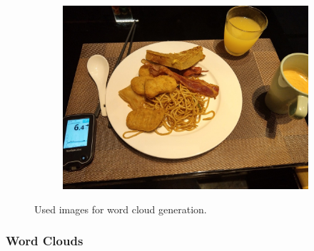 \begin{figure}[H]
\begin{subfigure}{\linewidth}
      \includegraphics[width=.3\linewidth]{Sections/4InitialWork/4_images_wordcloud/photo6.jpg}
      \end{subfigure}\par\medskip
      \caption{Used images for word cloud generation.}
    \end{figure}



    \subsubsection{Word Clouds}

